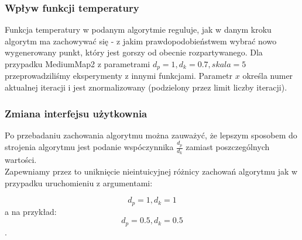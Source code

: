 \documentclass[12pt,a4paper]{article}
\begin{document}
\subsubsection{Wpływ funkcji temperatury}
Funkcja temperatury w podanym algorytmie reguluje, jak w danym kroku algorytm
ma zachowywać się - z jakim prawdopodobieństwem wybrać nowo wygenerowany punkt,
który jest gorszy od obecnie rozpartywanego.
Dla przypadku MediumMap2 z parametrami $d_p=1, d_k=0.7, skala=5$ przeprowadziliśmy
eksperymenty z innymi funkcjami. Parametr $x$ określa numer aktualnej iteracji
i jest znormalizowany (podzielony przez limit liczby iteracji).
\begin{figure}[H]
\begin{floatrow}
       }
       \ffigbox[\FBwidth]{\caption{MediumMap2, \newline
       $f(x)=exp(-x/100)$}\label{fig-14}}{%
         \texttt{[image: \{mediumMap2exp100]}.png}
       }
       \end{floatrow}
\end{figure}
\begin{figure}[H]
\begin{floatrow}
       }
       \ffigbox[\FBwidth]{\caption{MediumMap2, \newline
       $f(x)=-log(x)$}\label{fig-16}}{%
         \texttt{[image: \{mediumMap2log]}.png}
       }
       \end{floatrow}
\end{figure}

\subsubsection{Zmiana interfejsu użytkownia}
Po przebadaniu zachowania algorytmu można zauważyć,
że lepszym sposobem do strojenia algorytmu jest podanie
wspóczynnika $\frac{d_p}{d_k}$ zamiast poszczególnych wartości. \\ 
Zapewniamy przez to uniknięcie nieintuicyjnej różnicy zachowań algorytmu
jak w przypadku uruchomieniu z argumentami:
\begin{center}
\[d_p = 1, d_k = 1\]
a na przykład: \linebreak
\[d_p = 0.5, d_k = 0.5\].
\end{center}
%
\end{document}
